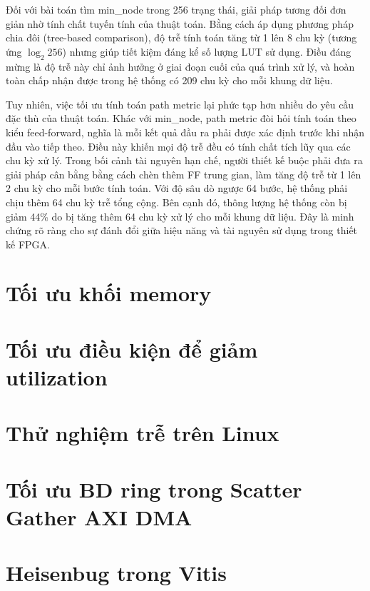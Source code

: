 \documentclass[../DoAn.tex]{subfiles}
\begin{document}
Đối với bài toán tìm min\_node trong 256 trạng thái, giải pháp tương đối đơn giản nhờ tính chất tuyến tính của thuật toán. Bằng cách áp dụng phương pháp chia đôi (tree-based comparison), độ trễ tính toán tăng từ 1 lên 8 chu kỳ (tương ứng $\log_{2} 256$) nhưng giúp tiết kiệm đáng kể số lượng LUT sử dụng. Điều đáng mừng là độ trễ này chỉ ảnh hưởng ở giai đoạn cuối của quá trình xử lý, và hoàn toàn chấp nhận được trong hệ thống có 209 chu kỳ cho mỗi khung dữ liệu.

Tuy nhiên, việc tối ưu tính toán path metric lại phức tạp hơn nhiều do yêu cầu đặc thù của thuật toán. Khác với min\_node, path metric đòi hỏi tính toán theo kiểu feed-forward, nghĩa là mỗi kết quả đầu ra phải được xác định trước khi nhận đầu vào tiếp theo. Điều này khiến mọi độ trễ đều có tính chất tích lũy qua các chu kỳ xử lý. Trong bối cảnh tài nguyên hạn chế, người thiết kế buộc phải đưa ra giải pháp cân bằng bằng cách chèn thêm FF trung gian, làm tăng độ trễ từ 1 lên 2 chu kỳ cho mỗi bước tính toán. Với độ sâu dò ngược 64 bước, hệ thống phải chịu thêm 64 chu kỳ trễ tổng cộng. Bên cạnh đó, thông lượng hệ thống còn bị giảm 44\% do bị tăng thêm 64 chu kỳ xử lý cho mỗi khung dữ liệu. Đây là minh chứng rõ ràng cho sự đánh đổi giữa hiệu năng và tài nguyên sử dụng trong thiết kế FPGA.


\section{Tối ưu khối memory}
\label{section:Tối ưu khối memory}


\section{Tối ưu điều kiện để giảm utilization}

\section{Thử nghiệm trễ trên Linux}

\section{Tối ưu BD ring trong Scatter Gather AXI DMA}

\section{Heisenbug trong Vitis}
\end{document}
